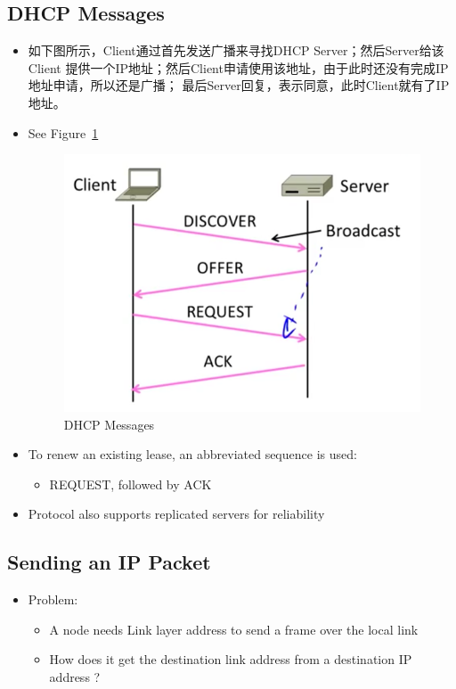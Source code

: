 \documentclass[12pt]{ctexart}   %
\begin{document}
	\subsection{DHCP Messages}
	\begin{itemize}
		\item 如下图所示，Client通过首先发送广播来寻找DHCP Server；然后Server给该Client 提供一个IP地址；然后Client申请使用该地址，由于此时还没有完成IP地址申请，所以还是广播； 最后Server回复，表示同意，此时Client就有了IP地址。
		\item See Figure~\ref{fig:4-6-2}
		
		\begin{figure}[h!] %
		\centering
		 \includegraphics[scale=0.7]{images/4-6-2}
		\caption{DHCP Messages}
		 \label{fig:4-6-2}
		 \end{figure}
		 
		 \item To renew an existing lease, an abbreviated sequence is used:
		\begin{itemize}
			\item  REQUEST, followed by ACK
		\end{itemize}
		
		\item Protocol also supports replicated servers for reliability
	\end{itemize}
	
	\subsection{Sending an IP Packet}
	\begin{itemize}
		\item Problem:
		\begin{itemize}
			\item A node needs Link layer address to send a frame over the local link
			\item How does it get the destination link address from a destination IP address ?
		\end{itemize}
	\end{itemize}
	
\end{document}
